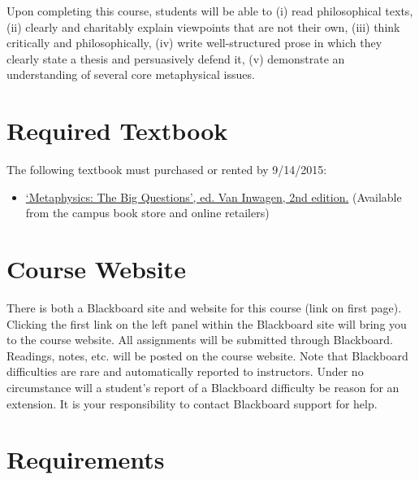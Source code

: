 \documentclass[article,oneside]{memoir}
\begin{document}
Upon completing this course, students will be able to (i) read
philosophical texts, (ii) clearly and charitably explain viewpoints that
are not their own, (iii) think critically and philosophically, (iv)
write well-structured prose in which they clearly state a thesis and
persuasively defend it, (v) demonstrate an understanding of several core
metaphysical issues.

\section{Required Textbook}

The following textbook must purchased or rented by 9/14/2015:

\begin{itemize}
\item
\href{http://www.amazon.com/Metaphysics-Questions-Peter-van-Inwagen/dp/1405125861/ref=sr_1_1?ie=UTF8&qid=1440685163&sr=8-1&keywords=metaphysics+big+questions}{`Metaphysics: The Big Questions', ed. Van Inwagen, 2nd edition.} (Available from the campus book store and online retailers)
\end{itemize}

\section{Course Website}
There is both a Blackboard site and website for this course (link on first page). Clicking the first link on the left panel within the Blackboard site will bring you to the course website. All assignments will be submitted through Blackboard. Readings, notes, etc. will be posted on the course website. Note that Blackboard difficulties are rare and automatically reported to instructors. Under no circumstance will a student's report of a Blackboard difficulty be reason for an extension. It is your responsibility to contact Blackboard support for help.


\section{Requirements}
\end{document}
